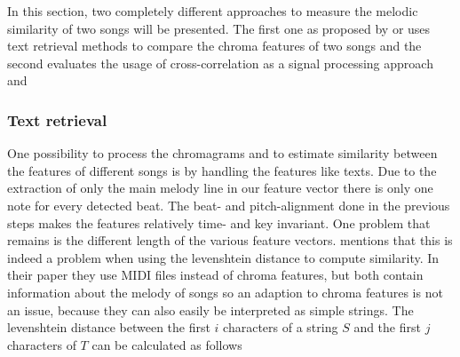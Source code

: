 In this section, two completely different approaches to measure the melodic similarity of two songs will be presented. The first one as proposed by \cite{chroma1} or \cite{chroma4} uses text retrieval methods to compare the chroma features of two songs and the second evaluates the usage of cross-correlation as a signal processing approach \cite{chroma2} and \cite{chroma3}

\subsubsection{Text retrieval}

One possibility to process the chromagrams and to estimate similarity between the features of different songs is by handling the features like texts. Due to the extraction of only the main melody line in our feature vector there is only one note for every detected beat. The beat- and pitch-alignment done in the previous steps makes the features relatively time- and key invariant. One problem that remains is the different length of the various feature vectors. \cite{chroma4} mentions that this is indeed a problem when using the levenshtein distance to compute similarity. In their paper they use MIDI files instead of chroma features, but both contain information about the melody of songs so an adaption to chroma features is not an issue, because they can also easily be interpreted as simple strings. The levenshtein distance between the first $i$ characters of a string $S$ and the first $j$ characters of $T$ can be calculated as follows \cite[p. 7]{chroma4}

